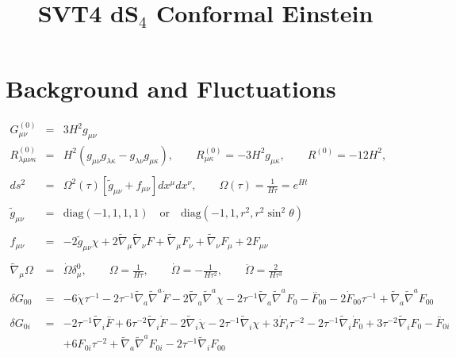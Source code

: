 \documentclass[10pt,letterpaper]{article}
\title{SVT4 dS${}_4$ Conformal Einstein}
\date{}
\numberwithin{equation}{section}
\begin{document}
 
\maketitle
\noindent 
\section{Background and Fluctuations}
\begin{eqnarray}
G^{(0)}_{\mu\nu} &=& 3H^{2} g_{\mu\nu}
\\
R^{(0)}_{\lambda\mu\nu\kappa} &=& H^{2} (g_{\mu\nu}g_{\lambda\kappa}-g_{\lambda\nu}g_{\mu\kappa}),
\qquad
R^{(0)}_{\mu\kappa} = -3 H^{2} g_{\mu\kappa},
\qquad
R^{(0)}= -12 H^{2},
\\ \nonumber\\
ds^2 &=& \Omega^2(\tau)[\tilde g_{\mu\nu}+ f_{\mu\nu}] dx^\mu dx^\nu,\qquad
\Omega(\tau) = \frac{1}{H\tau} = e^{Ht}
\label{geom}
\\ \nonumber\\
\tilde g_{\mu\nu} &=& \text{diag}(-1,1,1,1)\quad\text{or}\quad \text{diag}(-1,1,r^2,r^2\sin^2\theta)
\\ \nonumber\\
f_{\mu\nu} &=& -2\tilde g_{\mu\nu} \chi + 2\tilde\nabla_\mu\tilde\nabla_\nu F + \tilde\nabla_\mu F_\nu + \tilde\nabla_\nu F_\mu + 2F_{\mu\nu}
\label{svt}
\\ \nonumber\\
\tilde\nabla_\mu \Omega &=&  \dot\Omega \delta^0_\mu ,\qquad \Omega = \frac{1}{H\tau},
\qquad \dot \Omega = -\frac{1}{H\tau^2},\qquad \ddot\Omega = \frac{2}{H\tau^3}
\\ \nonumber\\
\delta G_{00}&=& -6 \dot{\chi} \tau^{-1} - 2 \tau^{-1} \tilde{\nabla}_{a}\tilde{\nabla}^{a}\dot{F} - 2 \tilde{\nabla}_{a}\tilde{\nabla}^{a}\chi -2 \tau^{-1} \tilde{\nabla}_{a}\tilde{\nabla}^{a}F_{0}{}- \overset{..}{F}_{00}{} - 2 \dot{F}_{00}{} \tau^{-1} + \tilde{\nabla}_{a}\tilde{\nabla}^{a}F_{00}{}
\\  \nonumber\\ 
\delta G_{0i}&=& -2 \tau^{-1} \tilde{\nabla}_{i}\overset{..}{F} + 6 \tau^{-2} \tilde{\nabla}_{i}\dot{F} - 2 \tilde{\nabla}_{i}\dot{\chi} - 2 \tau^{-1} \tilde{\nabla}_{i}\chi +3 \dot{F}_{i} \tau^{-2} - 2 \tau^{-1} \tilde{\nabla}_{i}\dot{F}_{0}{} + 3 \tau^{-2} \tilde{\nabla}_{i}F_{0}{}- \overset{..}{F}_{0i}{} \nonumber \\ 
&& + 6 F_{0i}{} \tau^{-2} + \tilde{\nabla}_{a}\tilde{\nabla}^{a}F_{0i}{} - 2 \tau^{-1} \tilde{\nabla}_{i}F_{00}{}

\end{eqnarray}
\end{document}
